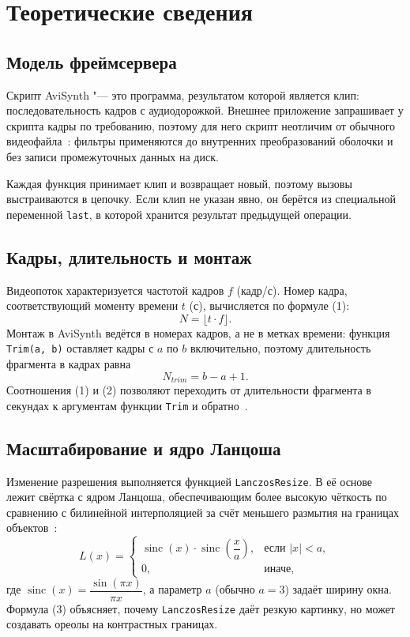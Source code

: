 \section{Теоретические сведения}

\subsection{Модель фреймсервера}
Скрипт AviSynth "--- это программа, результатом которой является клип:
последовательность кадров с аудиодорожкой. Внешнее приложение запрашивает
у скрипта кадры по требованию, поэтому для него скрипт неотличим от
обычного видеофайла~\cite{avisynth}: фильтры применяются до внутренних
преобразований оболочки и без записи промежуточных данных на диск.

Каждая функция принимает клип и возвращает новый, поэтому вызовы
выстраиваются в цепочку. Если клип не указан явно, он берётся из
специальной переменной \texttt{last}, в которой хранится результат
предыдущей операции.

\subsection{Кадры, длительность и монтаж}
Видеопоток характеризуется частотой кадров $f$ (кадр/с). Номер кадра,
соответствующий моменту времени $t$ (с), вычисляется по формуле (1):
\begin{equation}
N = \lfloor t \cdot f \rfloor .
\end{equation}
Монтаж в AviSynth ведётся в номерах кадров, а не в метках времени: функция
\texttt{Trim(a, b)} оставляет кадры с $a$ по $b$ включительно, поэтому
длительность фрагмента в кадрах равна
\begin{equation}
N_{trim} = b - a + 1 .
\end{equation}
Соотношения (1) и (2) позволяют переходить от длительности фрагмента
в секундах к аргументам функции \texttt{Trim} и обратно~\cite{avisynth}.

\subsection{Масштабирование и ядро Ланцоша}
Изменение разрешения выполняется функцией \texttt{LanczosResize}. В её
основе лежит свёртка с ядром Ланцоша, обеспечивающим более высокую чёткость
по сравнению с билинейной интерполяцией за счёт меньшего размытия на
границах объектов~\cite{lanczosres}:
\begin{equation}
L(x) =
\begin{cases}
\operatorname{sinc}(x) \cdot \operatorname{sinc}\!\left(\dfrac{x}{a}\right), & \text{если } |x| < a, \\
0, & \text{иначе},
\end{cases}
\end{equation}
где $\operatorname{sinc}(x) = \dfrac{\sin(\pi x)}{\pi x}$, а параметр $a$
(обычно $a = 3$) задаёт ширину окна. Формула (3) объясняет, почему
\texttt{LanczosResize} даёт резкую картинку, но может создавать ореолы на
контрастных границах.
